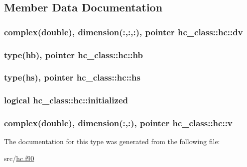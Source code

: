 \subsection{Member Data Documentation}
\hypertarget{structhc__class_1_1hc_ae44fb8b1351b045650148c174099a1a1}{
\subsubsection[{dv}]{\setlength{\rightskip}{0pt plus 5cm}complex(double), dimension(\-:,\-:,\-:), pointer hc\-\_\-class\-::hc\-::dv\hspace{0.3cm}{\ttfamily [private]}}}\label{structhc__class_1_1hc_ae44fb8b1351b045650148c174099a1a1}
\hypertarget{structhc__class_1_1hc_a87af1d9489543e7f6a7501ea8468f763}{
\subsubsection[{hb}]{\setlength{\rightskip}{0pt plus 5cm}type(hb), pointer hc\-\_\-class\-::hc\-::hb\hspace{0.3cm}{\ttfamily [private]}}}\label{structhc__class_1_1hc_a87af1d9489543e7f6a7501ea8468f763}
\hypertarget{structhc__class_1_1hc_a09dd08ce79ada0e7a9f7c3eb8a2a50f5}{
\subsubsection[{hs}]{\setlength{\rightskip}{0pt plus 5cm}type(hs), pointer hc\-\_\-class\-::hc\-::hs\hspace{0.3cm}{\ttfamily [private]}}}\label{structhc__class_1_1hc_a09dd08ce79ada0e7a9f7c3eb8a2a50f5}
\hypertarget{structhc__class_1_1hc_a89151c80172cb67d68a44b6264afb8a7}{
\subsubsection[{initialized}]{\setlength{\rightskip}{0pt plus 5cm}logical hc\-\_\-class\-::hc\-::initialized\hspace{0.3cm}{\ttfamily [private]}}}\label{structhc__class_1_1hc_a89151c80172cb67d68a44b6264afb8a7}
\hypertarget{structhc__class_1_1hc_ad3bab6b18bd729b4e1c49f7d14c0b4f9}{
\subsubsection[{v}]{\setlength{\rightskip}{0pt plus 5cm}complex(double), dimension(\-:,\-:), pointer hc\-\_\-class\-::hc\-::v\hspace{0.3cm}{\ttfamily [private]}}}\label{structhc__class_1_1hc_ad3bab6b18bd729b4e1c49f7d14c0b4f9}


The documentation for this type was generated from the following file\-:\begin{DoxyCompactItemize}
\item 
src/\hyperlink{hc_8f90}{hc.\-f90}\end{DoxyCompactItemize}
